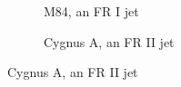 \begin{figure}
    \begin{subfigure}[t]{0.365\textwidth}
        \caption{ M84, an FR I jet}
    \end{subfigure}
    \begin{subfigure}[t]{0.635\textwidth}
        \caption{Cygnus A, an FR II jet}
    \end{subfigure}
    

\end{figure}

